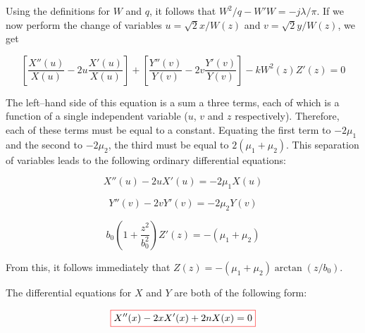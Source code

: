 Using the definitions for $W$ and $q$, it follows that $W^2/q - W'W = -j \lambda / \pi$. If we now perform the change of variables $u = \sqrt{2} x / W(z)$ and  $v = \sqrt{2} y / W(z)$, we get

\begin{equation}
\left[{\frac{X''(u)}{X(u)} - 2 u\frac{X'(u)}{X(u)}}\right] + 
\left[{\frac{Y''(v)}{Y(v)} - 2 v\frac{Y'(v)}{Y(v)}}\right] -kW^2(z)Z'(z) = 0
\end{equation} 

The left--hand side of this equation is a sum a three terms, each of which is a function of a single independent variable ($u$, $v$ and $z$ respectively). Therefore, each of these terms must be equal to a constant. Equating the first term to $-2\mu_1$ and the second to $-2\mu_2$, the third must be equal to $2(\mu_1+\mu_2)$. This separation of variables leads to the following ordinary differential equations:

\begin{equation}
X''(u) - 2 u X'(u) = - 2 \mu_1 X(u) 
\end{equation} 

\begin{equation}
Y''(v) - 2 v Y'(v) = - 2 \mu_2 Y(v)
\end{equation} 

\begin{equation}
b_0\left(1 + \frac{z^2}{b_0^2}\right)Z'(z) = -(\mu_1+\mu_2)
\end{equation} 

From this, it follows immediately that $Z(z) = -(\mu_1+\mu_2) \arctan(z/b_0)$.

The differential equations for $X$ and $Y$ are both of the following form:

\begin{equation}
\fbox{$\displaystyle
X''(x) - 2 x X'(x) + 2 n X(x) = 0 \label{eq-diff-hermite-0}
$}
\end{equation} 

